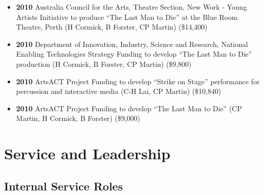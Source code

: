 \documentclass[11pt, a4paper, oneside]{article}
\begin{document}
\begin{itemize}
\item \textbf{2010} Australia Council for the Arts, Theatre Section, New Work - Young Artists Initiative to produce ``The Last Man to Die'' at the Blue Room Theatre, Perth (H Cormick, B Forster, CP Martin) (\$14,400)

\item \textbf{2010} Department of Innovation, Industry, Science and Research, National Enabling Technologies Strategy Funding to develop ``The Last Man to Die'' production (H Cormick, B Forster, CP Martin) (\$9,800)

\item \textbf{2010} ArtsACT Project Funding to develop ``Strike on Stage'' performance for percussion and interactive media (C-H Lai, CP Martin) (\$10,840)

\item \textbf{2010} ArtsACT Project Funding to develop ``The Last Man to Die'' (CP Martin, H Cormick, B Forster) (\$9,000)


\end{itemize}

\pagebreak
\section{Service and Leadership}
\label{serviceleadership}

\subsection*{Internal Service Roles}
\end{document}
